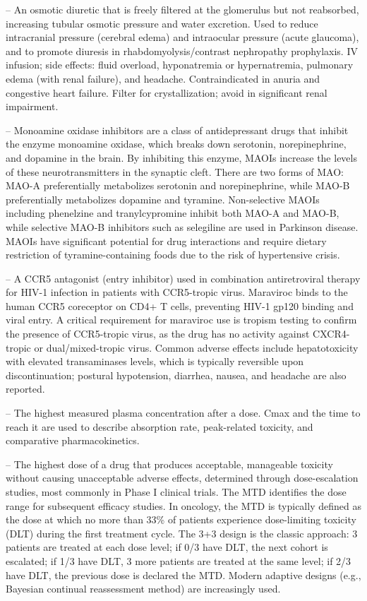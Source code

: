 -- An osmotic diuretic that is freely filtered at the glomerulus but not reabsorbed, increasing tubular osmotic pressure and water excretion. Used to reduce intracranial pressure (cerebral edema) and intraocular pressure (acute glaucoma), and to promote diuresis in rhabdomyolysis/contrast nephropathy prophylaxis. IV infusion; side effects: fluid overload, hyponatremia or hypernatremia, pulmonary edema (with renal failure), and headache. Contraindicated in anuria and congestive heart failure. Filter for crystallization; avoid in significant renal impairment.

-- Monoamine oxidase inhibitors are a class of antidepressant drugs that inhibit the enzyme monoamine oxidase, which breaks down serotonin, norepinephrine, and dopamine in the brain. By inhibiting this enzyme, MAOIs increase the levels of these neurotransmitters in the synaptic cleft. There are two forms of MAO: MAO-A preferentially metabolizes serotonin and norepinephrine, while MAO-B preferentially metabolizes dopamine and tyramine. Non-selective MAOIs including phenelzine and tranylcypromine inhibit both MAO-A and MAO-B, while selective MAO-B inhibitors such as selegiline are used in Parkinson disease. MAOIs have significant potential for drug interactions and require dietary restriction of tyramine-containing foods due to the risk of hypertensive crisis.

-- A CCR5 antagonist (entry inhibitor) used in combination antiretroviral therapy for HIV-1 infection in patients with CCR5-tropic virus. Maraviroc binds to the human CCR5 coreceptor on CD4+ T cells, preventing HIV-1 gp120 binding and viral entry. A critical requirement for maraviroc use is tropism testing to confirm the presence of CCR5-tropic virus, as the drug has no activity against CXCR4-tropic or dual/mixed-tropic virus. Common adverse effects include hepatotoxicity with elevated transaminases levels, which is typically reversible upon discontinuation; postural hypotension, diarrhea, nausea, and headache are also reported.

-- The highest measured plasma concentration after a dose. Cmax and the time to reach it are used to describe absorption rate, peak-related toxicity, and comparative pharmacokinetics.

-- The highest dose of a drug that produces acceptable, manageable toxicity without causing unacceptable adverse effects, determined through dose-escalation studies, most commonly in Phase I clinical trials. The MTD identifies the dose range for subsequent efficacy studies. In oncology, the MTD is typically defined as the dose at which no more than 33\% of patients experience dose-limiting toxicity (DLT) during the first treatment cycle. The 3+3 design is the classic approach: 3 patients are treated at each dose level; if 0/3 have DLT, the next cohort is escalated; if 1/3 have DLT, 3 more patients are treated at the same level; if 2/3 have DLT, the previous dose is declared the MTD. Modern adaptive designs (e.g., Bayesian continual reassessment method) are increasingly used.


